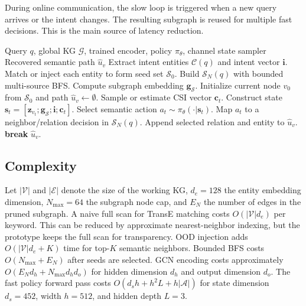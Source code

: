 \documentclass[journal]{IEEEtran}
\newcommand{\KG}{\mathcal{G}}
\newcommand{\SG}{\mathcal{S}}
\newcommand{\calA}{\mathcal{A}}
\newcommand{\calC}{\mathcal{C}}
\newcommand{\calE}{\mathcal{E}}
\newcommand{\calS}{\mathcal{S}}
\newcommand{\calV}{\mathcal{V}}
\begin{document}
During online communication, the slow loop is triggered when a new query arrives or the intent changes. The resulting subgraph is reused for multiple fast decisions. This is the main source of latency reduction.

\begin{algorithm}[!t]
\caption{Online Intent-Conditioned Semantic Communication}
\label{alg:online}
\begin{algorithmic}[1]
\REQUIRE Query $q$, global KG $\KG$, trained encoder, policy $\pi_\theta$, channel state sampler
\ENSURE Recovered semantic path $\hat{u}_v$
\STATE Extract intent entities $\calC(q)$ and intent vector $\mathbf{i}$.
\STATE Match or inject each entity to form seed set $\calS_0$.
\STATE Build $\SG_N(q)$ with bounded multi-source BFS.
\STATE Compute subgraph embedding $\mathbf{g}_{\SG}$.
\STATE Initialize current node $v_0$ from $\calS_0$ and path $\hat{u}_v\leftarrow \emptyset$.
    \STATE Sample or estimate CSI vector $\mathbf{c}_t$.
    \STATE Construct state $\mathbf{s}_t=[\mathbf{z}_{v_t};\mathbf{g}_{\SG};\mathbf{i};\mathbf{c}_t]$.
    \STATE Select semantic action $a_t\sim\pi_\theta(\cdot|\mathbf{s}_t)$.
    \STATE Map $a_t$ to a neighbor/relation decision in $\SG_N(q)$.
    \STATE Append selected relation and entity to $\hat{u}_v$.
        \STATE \textbf{break}
    \ENDIF
\ENDFOR
\RETURN $\hat{u}_v$.
\end{algorithmic}
\end{algorithm}

\subsection{Complexity}

Let $|\calV|$ and $|\calE|$ denote the size of the working KG, $d_e=128$ the entity embedding dimension, $N_{\max}=64$ the subgraph node cap, and $E_N$ the number of edges in the pruned subgraph. A naive full scan for TransE matching costs $O(|\calV|d_e)$ per keyword. This can be reduced by approximate nearest-neighbor indexing, but the prototype keeps the full scan for transparency. OOD injection adds $O(|\calV|d_e+K)$ time for top-$K$ semantic neighbors. Bounded BFS costs $O(N_{\max}+E_N)$ after seeds are selected. GCN encoding costs approximately $O(E_Nd_h+N_{\max}d_hd_o)$ for hidden dimension $d_h$ and output dimension $d_o$. The fast policy forward pass costs $O(d_s h+h^2L+h|\calA|)$ for state dimension $d_s=452$, width $h=512$, and hidden depth $L=3$.
\end{document}
